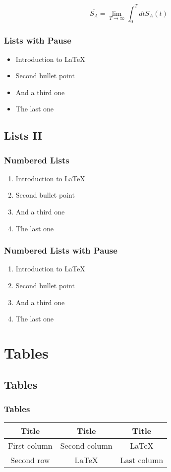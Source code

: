 \documentclass{beamer}
\begin{document}
\begin{frame}
   \[
      \overline{S_A}=\lim_{T\to\infty}\int_0^T dt S_{A}(t)
   \]
\end{frame}
\begin{frame}\frametitle{Lists with Pause}
   \begin{itemize}
      \item Introduction to  \LaTeX \pause 
      \item Second bullet point \pause 
      \item And a third one \pause 
      \item The last one
   \end{itemize} 
\end{frame}



\subsection{Lists II}
\begin{frame}
   \frametitle{Numbered Lists}
   \begin{enumerate}
      \item Introduction to  \LaTeX  
      \item Second bullet point 
      \item And a third one
      \item The last one
   \end{enumerate}
\end{frame}



\begin{frame}
   \frametitle{Numbered Lists with Pause}
   \begin{enumerate}
      \item Introduction to  \LaTeX \pause 
      \item Second bullet point \pause 
      \item And a third one \pause 
      \item The last one
   \end{enumerate}
\end{frame}



\section{Tables} 
\subsection{Tables}
\begin{frame}
   \frametitle{Tables}
   \begin{tabular}{|c|c|c|}
      \hline
      \textbf{Title} & \textbf{Title} & \textbf{Title} \\
      \hline
      First column & Second column &  \LaTeX  \\
      \hline
      Second row & \LaTeX & Last column \\
      \hline
   \end{tabular}
\end{frame}
\end{document}
